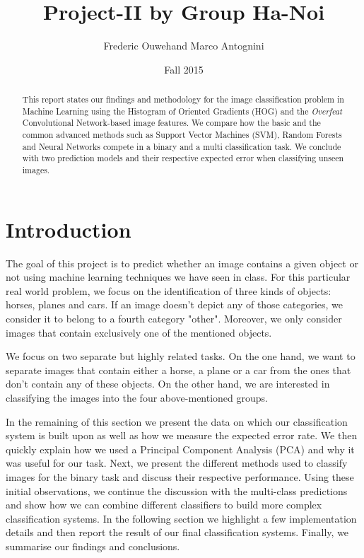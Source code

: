 \documentclass{article} %
\title{Project-II by Group Ha-Noi}
\author{
Frederic Ouwehand \And Marco Antognini
}
\date{Fall 2015}
\begin{document}
\maketitle

\begin{abstract}

This report states our findings and methodology for the image classification problem in Machine Learning using the Histogram of Oriented Gradients (HOG) and the \textit{Overfeat} Convolutional Network-based image features. We compare how the basic and the common advanced methods such as Support Vector Machines (SVM), Random Forests and Neural Networks compete in a binary and a multi classification task. We conclude with two prediction models and their respective expected error when classifying unseen images.

\end{abstract}

\section{Introduction}

The goal of this project is to predict whether an image contains a given object or not using machine learning techniques we have seen in class. For this particular real world problem, we focus on the identification of three kinds of objects: horses, planes and cars. If an image doesn't depict any of those categories, we consider it to belong to a fourth category "other". Moreover, we only consider images that contain exclusively one of the mentioned objects.

We focus on two separate but highly related tasks. On the one hand, we want to separate images that contain either a horse, a plane or a car from the ones that don't contain any of these objects. On the other hand, we are interested in classifying the images into the four above-mentioned groups.

In the remaining of this section we present the data on which our classification system is built upon as well as how we measure the expected error rate. We then quickly explain how we used a Principal Component Analysis (PCA) and why it was useful for our task. Next, we present the different methods used to classify images for the binary task and discuss their respective performance. Using these initial observations, we continue the discussion with the multi-class predictions and show how we can combine different classifiers to build more complex classification systems. In the following section we highlight a few implementation details and then report the result of our final classification systems. Finally, we summarise our findings and conclusions.
\end{document}
